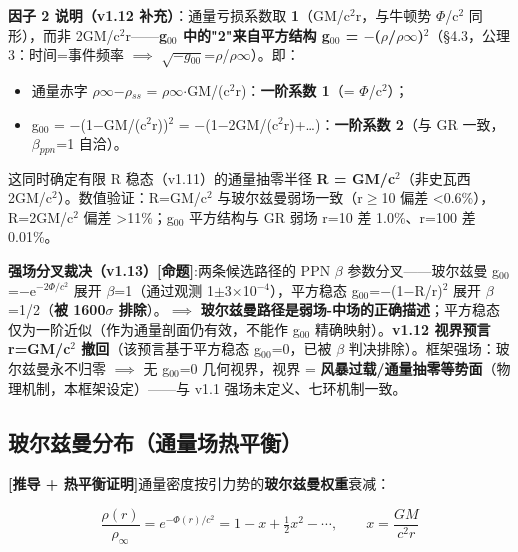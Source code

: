 \documentclass[UTF8,fontset=windows]{csoarticle}
\newcommand{\mtag}[1]{\textbf{[#1]}}
\newcommand{\up}[1]{\ensuremath{^{#1}}}
\newcommand{\down}[1]{\ensuremath{_{#1}}}
\begin{document}
\textbf{因子 2 说明（v1.12 补充）}：通量亏损系数取 \textbf{1}（GM/c\up{2}r，与牛顿势 \ensuremath{\Phi}/c\up{2} 同形），而非 2GM/c\up{2}r------\textbf{g\down{00} 中的"2"来自平方结构 g\down{00} = \ensuremath{-}(\ensuremath{\rho}/\ensuremath{\rho}\ensuremath{\infty})\up{2}}（\S{}4.3，公理 3：时间=事件频率 \ensuremath{\implies} \ensuremath{\sqrt{-g\down{00}}}=\ensuremath{\rho}/\ensuremath{\rho}\ensuremath{\infty}）。即：
\begin{itemize}
\item 通量赤字 \ensuremath{\rho}\ensuremath{\infty}\ensuremath{-}\ensuremath{\rho}\down{ss} = \ensuremath{\rho}\ensuremath{\infty}\ensuremath{\cdot}GM/(c\up{2}r)：\textbf{一阶系数 1}（= \ensuremath{\Phi}/c\up{2}）；
\item g\down{00} = \ensuremath{-}(1\ensuremath{-}GM/(c\up{2}r))\up{2} = \ensuremath{-}(1\ensuremath{-}2GM/(c\up{2}r)+\ldots{})：\textbf{一阶系数 2}（与 GR 一致，\ensuremath{\beta}\down{ppn}=1 自洽）。
\end{itemize}
这同时确定有限 R 稳态（v1.11）的通量抽零半径 \textbf{R = GM/c\up{2}}（非史瓦西 2GM/c\up{2}）。数值验证：R=GM/c\up{2} 与玻尔兹曼弱场一致（r\ensuremath{\geq}10 偏差 <0.6\%），R=2GM/c\up{2} 偏差 >11\%；g\down{00} 平方结构与 GR 弱场 r=10 差 1.0\%、r=100 差 0.01\%。

\textbf{强场分叉裁决（v1.13）}\mtag{命题}:两条候选路径的 PPN \ensuremath{\beta} 参数分叉------玻尔兹曼 g\down{00}=\ensuremath{-}e\up{-2\Phi{}/c^{2}} 展开 \ensuremath{\beta}=1（通过观测 1\ensuremath{\pm}3\ensuremath{\times}10\up{-4}），平方稳态 g\down{00}=\ensuremath{-}(1\ensuremath{-}R/r)\up{2} 展开 \ensuremath{\beta}=1/2（\textbf{被 1600\ensuremath{\sigma} 排除}）。\ensuremath{\implies} \textbf{玻尔兹曼路径是弱场-中场的正确描述}；平方稳态仅为一阶近似（作为通量剖面仍有效，不能作 g\down{00} 精确映射）。\textbf{v1.12 视界预言 r=GM/c\up{2} 撤回}（该预言基于平方稳态 g\down{00}=0，已被 \ensuremath{\beta} 判决排除）。框架强场：玻尔兹曼永不归零 \ensuremath{\implies} 无 g\down{00}=0 几何视界，视界 = \textbf{风暴过载/通量抽零等势面}（物理机制，本框架设定）------与 v1.1 强场未定义、七环机制一致。

\subsection{玻尔兹曼分布（通量场热平衡）}

\mtag{推导 + 热平衡证明}通量密度按引力势的\textbf{玻尔兹曼权重}衰减：

\[\frac{\rho(r)}{\rho_\infty} = e^{-\Phi(r)/c^2} = 1 - x + \tfrac12 x^2 - \cdots,\qquad x = \frac{GM}{c^2 r}\]
\end{document}
